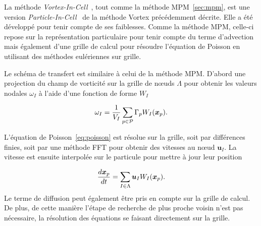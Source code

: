 La méthode \textit{Vortex-In-Cell}~\cite{christiansen_1973}, tout comme la méthode MPM~\ref{sec:mpm}, est une version \textit{Particle-In-Cell}~\cite{birdsall_1969} de la méthode Vortex précédemment décrite. Elle a été développé pour tenir compte de ses faiblesses. Comme la méthode MPM, celle-ci repose sur la représentation particulaire pour tenir compte du terme d'advection mais également d'une grille de calcul pour résoudre l'équation de Poisson en utilisant des méthodes eulériennes sur grille.

Le schéma de transfert est similaire à celui de la méthode MPM. D'abord une projection du champ de vorticité sur la grille de nœuds $\Lambda$ pour obtenir les valeurs nodales $\omega_I$ à l'aide d'une fonction de forme $W_I$

\begin{equation*}
    \omega_I = \frac{1}{V_I}\sum_{p \in \mathcal P} \Gamma_p W_I(\bm{x}_p).
\end{equation*}

L'équation de Poisson~\ref{eq:poisson} est résolue sur la grille, soit par différences finies, soit par une méthode FFT pour obtenir des vitesses au nœud $\bm u_I$. La vitesse est ensuite interpolée sur le particule pour mettre à jour leur position

\begin{equation*}
    \frac{d \bm x_p}{d t} = \sum_{I \in \Lambda} \bm u_I W_I(\bm{x}_p).
\end{equation*}
Le terme de diffusion peut également être pris en compte sur la grille de calcul. De plus, de cette manière l'étape de recherche de plus proche voisin n'est pas nécessaire, la résolution des équations se faisant directement sur la grille.




